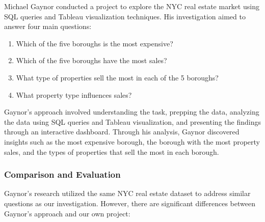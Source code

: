 \documentclass[
]{article}
\providecommand{\tightlist}{%
  \setlength{\itemsep}{0pt}\setlength{\parskip}{0pt}}
\begin{document}
Michael Gaynor conducted a project to explore the NYC real estate market
using SQL queries and Tableau visualization techniques. His
investigation aimed to answer four main questions:

\begin{enumerate}
\def\labelenumi{\arabic{enumi}.}
\tightlist
\item
  Which of the five boroughs is the most expensive?
\item
  Which of the five boroughs have the most sales?
\item
  What type of properties sell the most in each of the 5 boroughs?
\item
  What property type influences sales?
\end{enumerate}

Gaynor's approach involved understanding the task, prepping the data,
analyzing the data using SQL queries and Tableau visualization, and
presenting the findings through an interactive dashboard. Through his
analysis, Gaynor discovered insights such as the most expensive borough,
the borough with the most property sales, and the types of properties
that sell the most in each borough.

\hypertarget{comparison-and-evaluation}{%
\subsubsection{Comparison and
Evaluation}\label{comparison-and-evaluation}}

Gaynor's research utilized the same NYC real estate dataset to address
similar questions as our investigation. However, there are significant
differences between Gaynor's approach and our own project:
\end{document}
